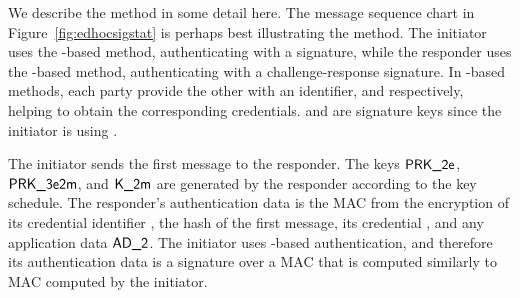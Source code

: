%
%

We describe the \mSigStat{} method in some detail here.
%
The message sequence chart in Figure~\ref{fig:edhocsigstat} is perhaps best
illustrating the method.
%
The initiator uses the \mSig{}-based method, authenticating with a signature,
while the responder uses the \mStat{}-based method, authenticating with a
challenge-response signature.
%
In \mStat{}-based methods, each party provide the other with an identifier,
\mIdcredi{} and \mIdcredr{} respectively, helping to obtain the corresponding
credentials.
%
\mCredi{} and \mLtki{} are signature keys since the initiator is using
\mSig.

The initiator sends the first message to the responder.
%
The keys $\textsf{PRK\_2e}$, $\textsf{PRK\_3e2m}$, and $\textsf{K\_2m}$ are generated by the responder
according to the key schedule.
%
The responder's authentication data \mAuthr{} is the MAC from the \mAead{}
encryption of its credential identifier \mIdcredr{}, the hash of the first
message, its credential \mCredr{}, and any application data $\textsf{AD\_2}$.
%
The initiator uses \mSig{}-based authentication, and therefore its
authentication data
\mAuthi{} is a signature over a MAC that is computed similarly to MAC computed
by the initiator.


